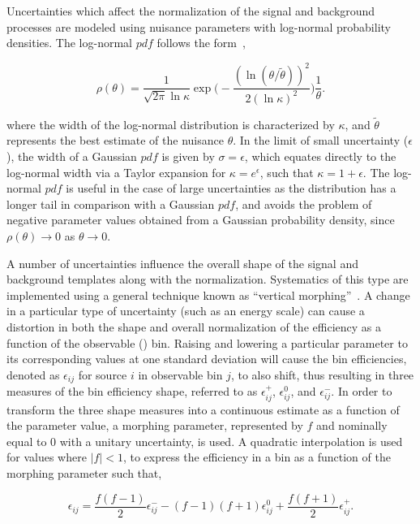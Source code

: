 Uncertainties which affect the normalization of the signal and background processes are modeled using nuisance parameters with log-normal probability densities. The log-normal $pdf$ follows the form~\cite{CMS-NOTE-2011-005},

\begin{equation}
  \rho(\theta) = \frac{1}{\sqrt{2\pi}\ln{\kappa}}\exp{\bigg(-\frac{(\ln{(\theta/\widetilde{\theta})})^2}{2(\ln{\kappa})^2}\bigg)}\frac{1}{\theta}.
\end{equation}

where the width of the log-normal distribution is characterized by $\kappa$, and $\widetilde{\theta}$ represents the best estimate of the nuisance $\theta$. In the limit of small uncertainty ($\epsilon$), the width of a Gaussian $pdf$ is given by $\sigma=\epsilon$, which equates directly to the log-normal width via a Taylor expansion for $\kappa = e^{\epsilon}$, such that $\kappa=1+\epsilon$. The log-normal $pdf$ is useful in the case of large uncertainties as the distribution has a longer tail in comparison with a Gaussian $pdf$, and avoids the problem of negative parameter values obtained from a Gaussian probability density, since $\rho(\theta)\rightarrow0$ as $\theta\rightarrow0$.

A number of uncertainties influence the overall shape of the signal and background \ptmiss templates along with the normalization. Systematics of this type are implemented using a general technique known as ``vertical morphing''~\cite{Conway:2011in}. A change in a particular type of uncertainty (such as an energy scale) can cause a distortion in both the shape and overall normalization of the efficiency as a function of the observable (\ptmiss) bin. Raising and lowering a particular parameter to its corresponding values at one standard deviation will cause the bin efficiencies, denoted as $\epsilon_{ij}$ for source $i$ in observable bin $j$, to also shift, thus resulting in three measures of the bin efficiency shape, referred to as $\epsilon^{+}_{ij}$, $\epsilon^{0}_{ij}$, and $\epsilon^{-}_{ij}$. In order to transform the three shape measures into a continuous estimate as a function of the parameter value, a morphing parameter, represented by $f$ and nominally equal to 0 with a unitary uncertainty, is used. A quadratic interpolation is used for values where $|f|<1$, to express the efficiency in a bin as a function of the morphing parameter such that, 

\begin{equation}
  \epsilon_{ij} = \frac{f(f-1)}{2}\epsilon^{-}_{ij} - (f-1)(f+1)\epsilon^{0}_{ij} + \frac{f(f+1)}{2}\epsilon^{+}_{ij}.
  \label{eq:morph}
\end{equation}

